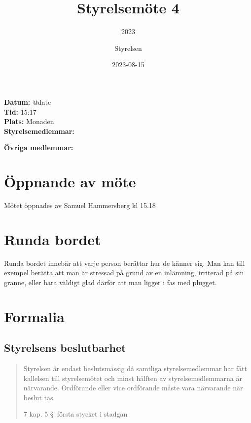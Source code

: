 \documentclass[protokoll]{dvd}
\begin{document}
\title{Styrelsemöte 4}
\subtitle{2023}
\author{Styrelsen}
\date{2023-08-15}

\textbf{Datum:} \csname @date\endcsname\\
\textbf{Tid:} 15:17\\
\textbf{Plats:} Monaden\\
\textbf{Styrelsemedlemmar:}
\begin{närvarande_förtroendevalda}
\end{närvarande_förtroendevalda}

\textbf{Övriga medlemmar:}
\begin{närvarande_medlemmar}
\end{närvarande_medlemmar}

\section{Öppnande av möte}

Mötet öppnades av Samuel Hammersberg kl 15.18

\section{Runda bordet}

Runda bordet innebär att varje person berättar hur de känner sig.
Man kan till exempel berätta att man är stressad på grund av en inlämning, irriterad på sin granne, eller bara väldigt glad därför att man ligger i fas med plugget.

\section{Formalia}

\subsection{Styrelsens beslutbarhet}

\blockquote[7 kap. 5 \S~första stycket i stadgan][]{%
    Styrelsen är endast beslutsmässig då samtliga styrelsemedlemmar har fått kallelsen till styrelsemötet och minst hälften av styrelsemedlemmarna är närvarande.
    Ordförande eller vice ordförande måste vara närvarande när beslut tas.
}
\end{document}
